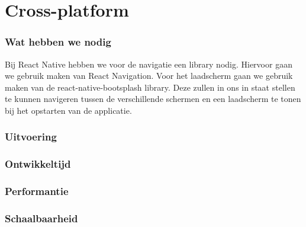 


\section{Cross-platform}
\subsubsection{Wat hebben we nodig}
Bij React Native hebben we voor de navigatie een library nodig. Hiervoor gaan we gebruik maken van
React Navigation. Voor het laadscherm gaan we gebruik maken van de react-native-bootsplash library. 
Deze zullen in ons in staat stellen te kunnen navigeren tussen de verschillende schermen en een
laadscherm te tonen bij het opstarten van de applicatie.

\subsubsection{Uitvoering}



\subsubsection{Ontwikkeltijd}



\subsubsection{Performantie}



\subsubsection{Schaalbaarheid}




